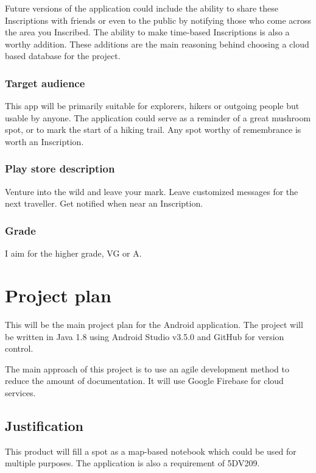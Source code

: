 \documentclass[]{article}
\begin{document}
\begin{flushleft}
Future versions of the application could include the ability to share these Inscriptions with friends or even to the public by notifying those who come across the area you Inscribed. The ability to make time-based Inscriptions is also a worthy addition. These additions are the main reasoning behind choosing a cloud based database for the project.\medskip

\subsubsection{Target audience}
This app will be primarily suitable for explorers, hikers or outgoing people but usable by anyone. The application could serve as a reminder of a great mushroom spot, or to mark the start of a hiking trail. Any spot worthy of remembrance is worth an Inscription.

\subsubsection{Play store description}

Venture into the wild and leave your mark.
Leave customized messages for the next traveller.
Get notified when near an Inscription.

\subsubsection{Grade}
I aim for the higher grade, VG or A.
\newpage

\section{Project plan}

This will be the main project plan for the Android application. The project will be written in Java 1.8 using Android Studio v3.5.0 and GitHub for version control.

The main approach of this project is to use an agile development method to reduce the amount of documentation. It will use Google Firebase for cloud services.

\subsection{Justification}

This product will fill a spot as a map-based notebook which could be used for multiple purposes.
The application is also a requirement of 5DV209.


\end{flushleft}
\end{document}
